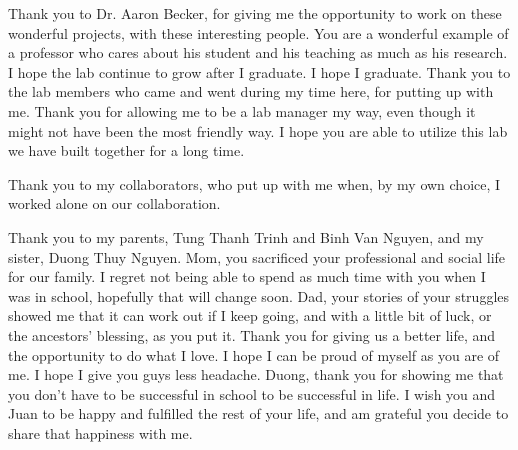

Thank you to Dr. Aaron Becker, for giving me the opportunity to work on these wonderful projects, with these interesting people.
You are a wonderful example of a professor who cares about his student and his teaching as much as his research.
I hope the lab continue to grow after I graduate.
I hope I graduate.
Thank you to the lab members who came and went during my time here, for putting up with me.
Thank you for allowing me to be a lab manager my way, even though it might not have been the most friendly way.
I hope you are able to utilize this lab we have built together for a long time.

Thank you to my collaborators, who put up with me when, by my own choice, I worked alone on our collaboration.

Thank you to my parents, Tung Thanh Trinh and Binh Van Nguyen, and my sister, Duong Thuy Nguyen.
Mom, you sacrificed your professional and social life for our family.
I regret not being able to spend as much time with you when I was in school, hopefully that will change soon.
Dad, your stories of your struggles showed me that it can work out if I keep going, and with a little bit of luck, or the ancestors' blessing, as you put it.
Thank you for giving us a better life, and the opportunity to do what I love.
I hope I can be proud of myself as you are of me.
I hope I give you guys less headache.
Duong, thank you for showing me that you don't have to be successful in school to be successful in life.
I wish you and Juan to be happy and fulfilled the rest of your life, and am grateful you decide to share that happiness with me.
